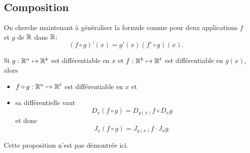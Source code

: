 \subsection{Composition} 

On cherche maintenant à généraliser la formule connue pour deux applications $f$ et $g$ de $\mathbb{R}$ dans $\mathbb{R}$:
$$
(f \circ g)'(x) = g'(x) (f' \circ g)(x).
$$

\begin{proposition} \label{prop:compositionDifferentielles}
  Si $g : \mathbb{R}^n \mapsto \mathbb{R}^k$ est différentiable en $x$ et $f : \mathbb{R}^k \mapsto \mathbb{R}^\ell$ est différentiable en $g(x)$, alors
  \begin{itemize}
   \item $f \circ g: \mathbb{R}^n \mapsto \mathbb{R}^\ell$ est différentiable en $x$ et
   \item sa différentielle vaut
   $$
   D_x(f \circ g) = D_{g(x)}f \circ D_xg
   $$
   et donc
   $$
   J_x(f \circ g) = J_{g(x)}f \cdot J_xg.
   $$
  \end{itemize}
\end{proposition}

Cette proposition n'est pas démontrée ici. \eproof


